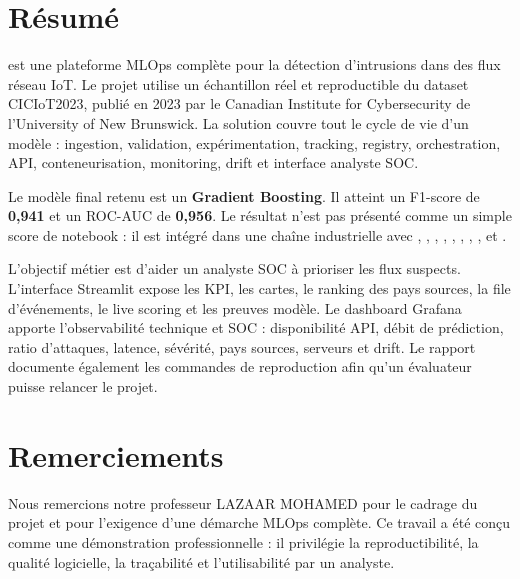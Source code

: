 \chapter*{Résumé}
\projectname{} est une plateforme MLOps complète pour la détection d'intrusions dans des flux réseau IoT. Le projet utilise un échantillon réel et reproductible du dataset CICIoT2023, publié en 2023 par le Canadian Institute for Cybersecurity de l'University of New Brunswick. La solution couvre tout le cycle de vie d'un modèle : ingestion, validation, expérimentation, tracking, registry, orchestration, API, conteneurisation, monitoring, drift et interface analyste SOC.

Le modèle final retenu est un \textbf{Gradient Boosting}. Il atteint un F1-score de \textbf{0,941} et un ROC-AUC de \textbf{0,956}. Le résultat n'est pas présenté comme un simple score de notebook : il est intégré dans une chaîne industrielle avec , , , , , , , ,  et .

L'objectif métier est d'aider un analyste SOC à prioriser les flux suspects. L'interface Streamlit expose les KPI, les cartes, le ranking des pays sources, la file d'événements, le live scoring et les preuves modèle. Le dashboard Grafana apporte l'observabilité technique et SOC : disponibilité API, débit de prédiction, ratio d'attaques, latence, sévérité, pays sources, serveurs et drift. Le rapport documente également les commandes de reproduction afin qu'un évaluateur puisse relancer le projet.

\chapter*{Remerciements}
Nous remercions notre professeur LAZAAR MOHAMED pour le cadrage du projet et pour l'exigence d'une démarche MLOps complète. Ce travail a été conçu comme une démonstration professionnelle : il privilégie la reproductibilité, la qualité logicielle, la traçabilité et l'utilisabilité par un analyste.
